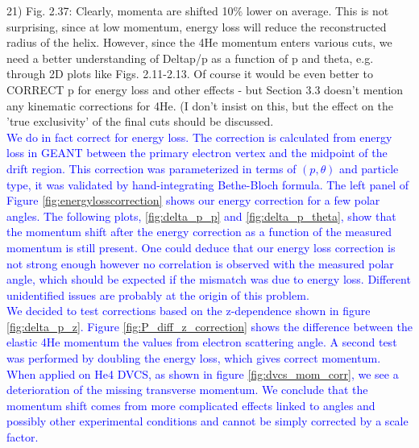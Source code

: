 21) Fig. 2.37: Clearly, momenta are shifted 10$\%$ lower on average. This is 
not surprising, since at low momentum, energy loss will reduce the 
reconstructed radius of the helix. However, since the 4He momentum enters 
various cuts, we need a better understanding of Deltap/p as a function of p and 
theta, e.g. through 2D plots like Figs. 2.11-2.13. Of course it would be even 
better to CORRECT p for energy loss and other effects - but Section 3.3 doesn't 
mention any kinematic corrections for 4He. (I don't insist on this, but the 
effect on the 'true exclusivity' of the final cuts should be discussed.\\  
\textcolor{blue}{We do in fact correct for energy loss. The correction is 
calculated from energy loss in GEANT between the primary electron vertex and
the midpoint of the drift region. This correction was parameterized in terms 
of $(p,\theta)$ and particle type, it was validated by hand-integrating 
Bethe-Bloch formula. The left panel of Figure \ref{fig:energylosscorrection} 
shows our energy correction for a few polar angles. 
The following plots, \ref{fig:delta_p_p} and \ref{fig:delta_p_theta}, 
show that the momentum shift after the energy correction 
as a function of the measured momentum is still present. One could deduce
that our energy loss correction is not strong enough however 
no correlation is observed with the measured polar angle, which
should be expected if the mismatch was due to energy loss. Different
unidentified issues are probably at the origin of this problem.}\\
\textcolor{blue}{We decided to test corrections based on the z-dependence shown
in figure \ref{fig:delta_p_z}. Figure \ref{fig:P_diff_z_correction} shows the 
difference between the elastic 4He momentum the values from electron scattering 
angle. A second test was performed by doubling the energy loss, which gives 
correct momentum.  When applied on He4 DVCS, as shown in figure 
\ref{fig:dvcs_mom_corr}, we see a deterioration of the missing transverse 
momentum. We conclude that the momentum shift comes from more complicated 
effects linked to angles and possibly other experimental conditions and cannot 
be simply corrected
by a scale factor.}\\

